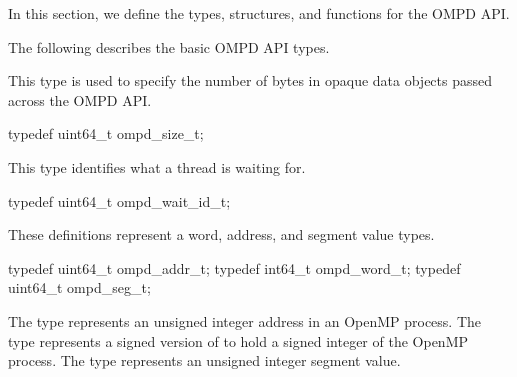 
In this section, we define the types, structures, and functions for the OMPD API.

The following describes the basic OMPD API types.

\label{ompd:ompd_size_t}

This type is used to specify the number of bytes in opaque data objects passed across the OMPD API.

\format

	\begin{ccppspecific}
	\begin{ompSyntax}
typedef uint64_t ompd_size_t;
	\end{ompSyntax}
	\end{ccppspecific}


\label{ompd:ompd_wait_id_t}

This type identifies what a thread is waiting for.

\format

	\begin{ccppspecific}
	\begin{ompSyntax}
typedef uint64_t ompd_wait_id_t;
	\end{ompSyntax}
	\end{ccppspecific}


\label{ompd:ompd_addr_t}
\label{ompd:ompd_word_t}
\label{ompd:ompd_seg_t}

These definitions represent a word, address, and segment value types.

\format

\begin{ccppspecific}
\begin{ompSyntax}
typedef uint64_t ompd_addr_t;
typedef int64_t  ompd_word_t;
typedef uint64_t ompd_seg_t;
\end{ompSyntax}
\end{ccppspecific}


The  type represents an unsigned integer address in an 
OpenMP process.
The  type represents a signed version of   to hold a signed 
integer of the OpenMP process.
The  type represents an unsigned integer segment value.

\label{ompd:ompd_address_t}

